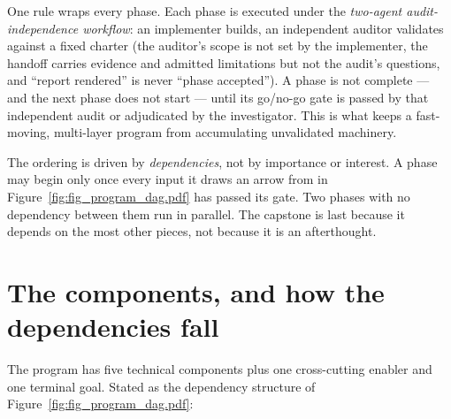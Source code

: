 \documentclass[11pt]{article}
\begin{document}
One rule wraps every phase. Each phase is executed under the \emph{two-agent
audit-independence workflow}: an implementer builds, an independent auditor
validates against a fixed charter (the auditor's scope is not set by the
implementer, the handoff carries evidence and admitted limitations but not the
audit's questions, and ``report rendered'' is never ``phase accepted''). A phase is
not complete --- and the next phase does not start --- until its go/no-go gate is
passed by that independent audit or adjudicated by the investigator. This is what
keeps a fast-moving, multi-layer program from accumulating unvalidated machinery.

\begin{note}
The ordering is driven by \emph{dependencies}, not by importance or interest. A
phase may begin only once every input it draws an arrow from in
Figure~\ref{fig:fig_program_dag.pdf} has passed its gate. Two phases with no
dependency between them run in parallel. The capstone is last because it depends on
the most other pieces, not because it is an afterthought.
\end{note}

\section{The components, and how the dependencies fall}\label{sec:components}

The program has five technical components plus one cross-cutting enabler and one
terminal goal. Stated as the dependency structure of
Figure~\ref{fig:fig_program_dag.pdf}:
\end{document}
